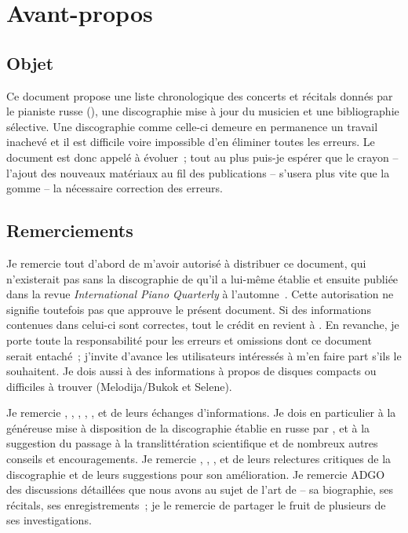 \chapter[%
Avant-propos][%
Avant-propos]{%
Avant-propos}
\label{chap:Avant-propos}

\section{Objet}

Ce document propose une liste chronologique des concerts et récitals donnés
par le pianiste russe \VSofronitsky{} (), une
discographie mise à jour du musicien et une bibliographie sélective.
Une discographie comme celle-ci demeure en permanence un travail inachevé et
il est difficile voire impossible d'en éliminer toutes les erreurs.
Le document est donc appelé à évoluer~; tout au plus puis-je espérer que le
crayon -- l'ajout des nouveaux matériaux au fil des publications -- s'usera
plus vite que la gomme -- la nécessaire correction des erreurs.

\section{Remerciements}

Je remercie tout d'abord \FMalik{} de m'avoir autorisé à distribuer ce
document, qui n'existerait pas sans la discographie de \Sofronitsky{} qu'il
a lui-même établie et ensuite publiée dans la revue \emph{International
Piano Quarterly} à l'automne~\citeyear{Malik}.
Cette autorisation ne signifie toutefois pas que \FMalik{} approuve le
présent document.
Si des informations contenues dans celui-ci sont correctes, tout le crédit
en revient à \FMalik{}.
En revanche, je porte toute la responsabilité pour les erreurs et omissions
dont ce document serait entaché~; j'invite d'avance les utilisateurs
intéressés à m'en faire part s'ils le souhaitent.
Je dois aussi à \FMalik{} des informations à propos de disques compacts
 ou difficiles à trouver (Melodija/Bukok et Selene).

Je remercie \MMourgue{}, \MDupuy{}, \RQuonten{}, \DCordova{}, \ARossi{},
\FGiuntoli{} et \VVoskobojnikov{} de leurs échanges d'informations.
Je dois en particulier à \ARossi{} la généreuse mise à disposition de la
discographie établie en russe par \INikonovich{}
\citep[voir][]{Nikonovich11}, et à \FGiuntoli{} la suggestion du passage à
la translittération scientifique et de nombreux autres conseils et
encouragements.
Je remercie \MDupuy{}, \RQuonten{}, \DCordova{}, \ARossi{} et \FGiuntoli{}
de leurs relectures critiques de la discographie et de leurs suggestions
pour son amélioration.
Je remercie ADGO des discussions détaillées que nous avons au sujet de l'art
de \VSofronitsky{} -- sa biographie, ses récitals, ses enregistrements~; je
le remercie de partager le fruit de plusieurs de ses investigations.

